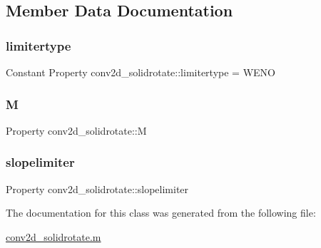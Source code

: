 \subsection{Member Data Documentation}
\mbox{\label{classconv2d__solidrotate_a1e6fd2f9f965314aa88a5e5769487af7}} 
\subsubsection{\texorpdfstring{limitertype}{limitertype}}
{\footnotesize\ttfamily Constant Property conv2d\+\_\+solidrotate\+::limitertype = \textquotesingle{}W\+E\+NO\textquotesingle{}}

\mbox{\label{classconv2d__solidrotate_a92e8c54efb4d1abe790e41670721bf34}} 
\subsubsection{\texorpdfstring{M}{M}}
{\footnotesize\ttfamily Property conv2d\+\_\+solidrotate\+::M}

\mbox{\label{classconv2d__solidrotate_a0d7d7e1bb255f5118d39348e81f07f70}} 
\subsubsection{\texorpdfstring{slopelimiter}{slopelimiter}}
{\footnotesize\ttfamily Property conv2d\+\_\+solidrotate\+::slopelimiter}



The documentation for this class was generated from the following file\+:\begin{DoxyCompactItemize}
\item 
\hyperlink{conv2d__solidrotate_8m}{conv2d\+\_\+solidrotate.\+m}\end{DoxyCompactItemize}

